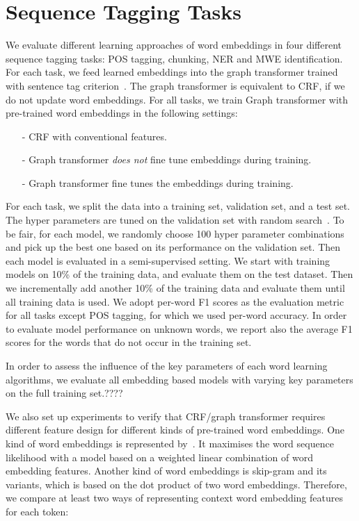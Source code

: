 \documentclass[11pt]{article}
\begin{document}
		



\section{Sequence Tagging Tasks}
We evaluate different learning approaches of word embeddings in four different sequence tagging tasks: POS tagging, chunking, NER and MWE identification.
For each task, we feed learned embeddings into the graph transformer trained with sentence tag criterion~\cite{turian2010word}. The graph transformer is equivalent to CRF, if we do not update word embeddings. For all tasks, we train Graph transformer with pre-trained word embeddings in the following settings: 

\begin{small}
\begin{itemize}
\item[-] CRF with conventional features.
\item[-] Graph transformer \textit{does not} fine tune embeddings during training.
\item[-] Graph transformer fine tunes the embeddings during training.
\end{itemize}
\end{small}

For each task, we split the data into a training set, validation set, and a test set. The hyper parameters are tuned on the validation set with random search~\cite{bergstra2012random}. To be fair, for each model, we randomly choose 100 hyper parameter combinations and pick up the best one based on its performance on the validation set. Then each model is evaluated in a semi-supervised setting. We start with training models on 10\% of the training data, and evaluate them on the test dataset. Then we incrementally add another 10\% of the training data and evaluate them until all training data is used. We adopt per-word F1 scores as the evaluation metric for all tasks except POS tagging, for which we used per-word accuracy.
In order to evaluate model performance on unknown words, we report also the average F1 scores for the words that do not occur in the training set.

In order to assess the influence of the key parameters of each word learning algorithms, we evaluate all embedding based models with varying key parameters on the full training set.????

We also set up experiments to verify that CRF/graph transformer requires different feature design for different kinds of pre-trained word embeddings. One kind of word embeddings is represented by~\cite{bengio2006neural}. It maximises the word sequence likelihood with a model based on a weighted linear combination of word embedding features. Another kind of word embeddings is skip-gram and its variants, which is based on the dot product of two word embeddings. Therefore, we compare at least two ways of representing context word embedding features for each token:
\end{document}
